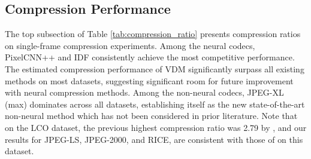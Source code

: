 \subsection{Compression Performance}\label{sec:main-results}

The top subsection of Table \ref{tab:compression_ratio} presents compression ratios on single-frame compression experiments. 
Among the neural codecs, PixelCNN++ and IDF consistently achieve the most competitive performance. The estimated compression performance of VDM significantly surpass all existing methods on most datasets, suggesting significant room for future improvement with neural compression methods.
Among the non-neural codecs, JPEG-XL (max) dominates across all datasets, establishing itself as the new state-of-the-art non-neural method which has not been considered in prior literature. Note that on the LCO dataset, the previous highest compression ratio was 2.79 by \citet{maireles2023efficient}, and our results for JPEG-LS, JPEG-2000, and RICE, are consistent with those of \citet{maireles2023efficient} on this dataset.




